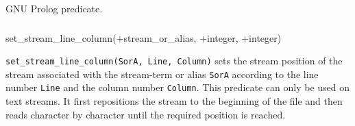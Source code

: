 \begin{PlErrors}







\end{PlErrors}

\Portability

GNU Prolog predicate.

\subsubsection{}

\begin{TemplatesOneCol}
set\_stream\_line\_column(+stream\_or\_alias, +integer, +integer)

\end{TemplatesOneCol}

\Description

\texttt{set\_stream\_line\_column(SorA, Line, Column)} sets the stream
position of the stream associated with the stream-term or alias \texttt{SorA}
according to the line number \texttt{Line} and the column number
\texttt{Column}. This predicate can only be used on text streams. It first
repositions the stream to the beginning of the file and then reads character
by character until the required position is reached.

